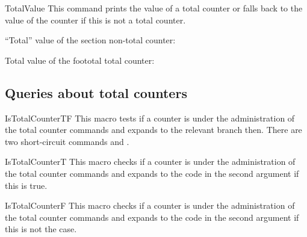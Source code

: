 \documentclass[12pt,a4paper,oneside]{article}
\makeatletter
\newcommand{\chdocextractversion}[1]{%
  \@nameuse{#1}%
}
\renewcommand{\tcbdocupdated}[1]{#1}%
\newcommand{\CHDocUpdate}[1]{\tcbdocmarginnote[doclang/updated={},colback={yellow},colframe={yellow!50!red},  fontupper={\tiny}
]{%
  \tcbdocupdated{\chdocextractversion{xassoccntversion#1}}%
}%
}
\newcommand{\CHDocExpCommand}[1][Expandable]{%
  \tcbdocmarginnote[doclang/new={N},
  colframe=green!50!blue,
  halign=left,
  colback={green!90!blue},
  fontupper={\tiny}
  ]{%
    #1%
  }%
}
\makeatother
\begin{document}

\begin{docCommand}[before={\CHDocExpCommand}]{TotalValue}{}\CHDocUpdate{0.9}%
This command prints the value of a total counter or falls back to the value of the counter if this is not a total counter. 

\begin{dispExample}
``Total'' value of the section non-total counter: 

Total value of the foototal total counter: 
\end{dispExample}


\end{docCommand}

\subsection{Queries about total counters}

\begin{docCommand}{IsTotalCounterTF}{}
This macro tests if a counter is under the administration of the total counter commands and expands to the relevant branch then. There are two short-circuit commands  and .
\end{docCommand}




\begin{docCommand}{IsTotalCounterT}{}
This macro checks if a counter is under the administration of the total counter commands and expands to the code in the second argument if this is true.
\end{docCommand}


\begin{docCommand}{IsTotalCounterF}{}
This macro checks if a counter is under the administration of the total counter commands and expands to the code in the second argument if this is not the case.
\end{docCommand}

\begin{dispExample}




\end{dispExample}
\end{document}

